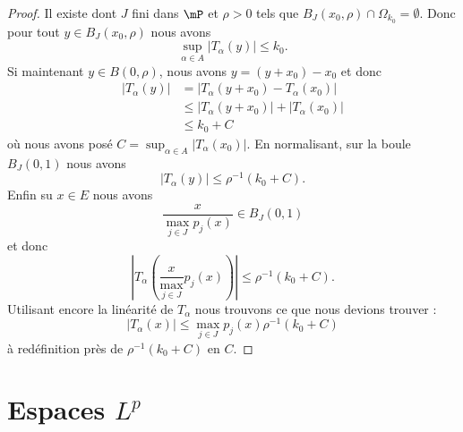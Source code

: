 \begin{proof}
    Il existe dont \( J\) fini dans \( \mP\) et \( \rho>0\) tels que \( B_J(x_0,\rho)\cap\Omega_{k_0}=\emptyset\). Donc pour tout \( y\in B_J(x_0,\rho)\) nous avons
    \begin{equation}
        \sup_{\alpha\in A}\big| T_{\alpha}(y) \big|\leq k_0.
    \end{equation}
    Si maintenant \( y\in B(0,\rho)\), nous avons \( y=(y+x_0)-x_0\) et donc
    \begin{subequations}
        \begin{align}
            \big| T_{\alpha}(y) \big|&=\big| T_{\alpha}(y+x_0)-T_{\alpha}(x_0) \big|\\
            &\leq \big| T_{\alpha}(y+x_0) \big|+\big| T_{\alpha}(x_0) \big|\\
            &\leq k_0+C
        \end{align}
    \end{subequations}
    où nous avons posé \( C=\sup_{\alpha\in A}\big| T_{\alpha}(x_0) \big|\). En normalisant, sur la boule \( B_J(0,1)\) nous avons
    \begin{equation}
        \big| T_{\alpha}(y) \big|\leq \rho^{-1}(k_0+C).
    \end{equation}
    Enfin su \( x\in E\) nous avons
    \begin{equation}
        \frac{ x }{ \max_{j\in J}p_j(x) }\in B_J(0,1)
    \end{equation}
    et donc
    \begin{equation}
        \left| T_{\alpha}\left( \frac{ x }{ \max_{j\in J} }p_j(x) \right) \right| \leq \rho^{-1}(k_0+C).
    \end{equation}
    Utilisant encore la linéarité de \( T_{\alpha}\) nous trouvons ce que nous devions trouver :
    \begin{equation}
        \big| T_{\alpha}(x) \big|\leq \max_{j\in J}p_j(x)\rho^{-1}(k_0+C)
    \end{equation}
    à redéfinition près de \( \rho^{-1}(k_0+C)\) en \( C\).
\end{proof}

\section{Espaces \texorpdfstring{$L^p$}{Lp}}
\label{SecVKiVIQK}

